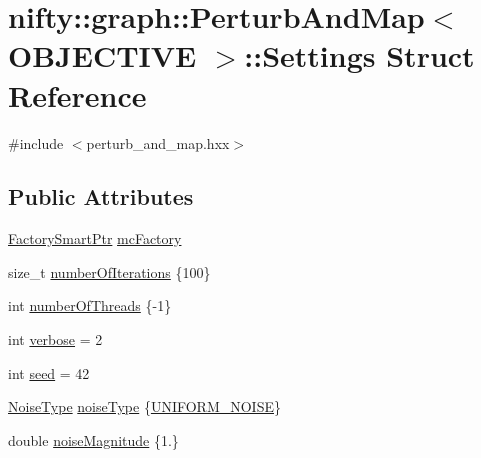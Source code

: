 \hypertarget{structnifty_1_1graph_1_1PerturbAndMap_1_1Settings}{}\section{nifty\+:\+:graph\+:\+:Perturb\+And\+Map$<$ O\+B\+J\+E\+C\+T\+I\+V\+E $>$\+:\+:Settings Struct Reference}
\label{structnifty_1_1graph_1_1PerturbAndMap_1_1Settings}


{\ttfamily \#include $<$perturb\+\_\+and\+\_\+map.\+hxx$>$}

\subsection*{Public Attributes}
\begin{DoxyCompactItemize}
\item 
\hyperlink{classnifty_1_1graph_1_1PerturbAndMap_a815db966f32373a375bb54709027997b}{Factory\+Smart\+Ptr} \hyperlink{structnifty_1_1graph_1_1PerturbAndMap_1_1Settings_ad63dffc6410459e3ac89532ce9cbb713}{mc\+Factory}
\item 
size\+\_\+t \hyperlink{structnifty_1_1graph_1_1PerturbAndMap_1_1Settings_acb4d1b7e589efdd78034b3f6ead5c013}{number\+Of\+Iterations} \{100\}
\item 
int \hyperlink{structnifty_1_1graph_1_1PerturbAndMap_1_1Settings_a6f9f777f1ad9b9b0a93704203967673a}{number\+Of\+Threads} \{-\/1\}
\item 
int \hyperlink{structnifty_1_1graph_1_1PerturbAndMap_1_1Settings_a53ac8b50248dd5b9617fb65c5caa74a1}{verbose} = 2
\item 
int \hyperlink{structnifty_1_1graph_1_1PerturbAndMap_1_1Settings_a29646de8478bcf876ed30e301b3855a6}{seed} = 42
\item 
\hyperlink{classnifty_1_1graph_1_1PerturbAndMap_adb807003c7f4b10bc0b4d931ba8d8a00}{Noise\+Type} \hyperlink{structnifty_1_1graph_1_1PerturbAndMap_1_1Settings_a1e4932347c59c54f2be26e2f824d6db4}{noise\+Type} \{\hyperlink{classnifty_1_1graph_1_1PerturbAndMap_adb807003c7f4b10bc0b4d931ba8d8a00ab3fc33ca907849e9193a9a41e5513eed}{U\+N\+I\+F\+O\+R\+M\+\_\+\+N\+O\+I\+S\+E}\}
\item 
double \hyperlink{structnifty_1_1graph_1_1PerturbAndMap_1_1Settings_a4a6935b4fc1d3a5f7b03ec84d1111fef}{noise\+Magnitude} \{1.\}
\end{DoxyCompactItemize}


